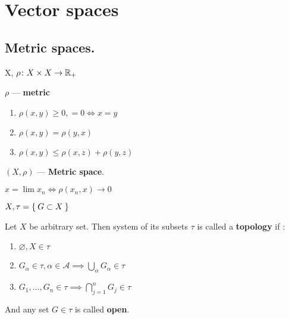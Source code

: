 \chapter{Vector spaces}
\section{Metric spaces.}

X, $\rho\colon X \times X \to \mathbb{R}_+$
\begin{defn}$\rho$ --- \textbf{metric}
  \begin{enumerate}
    \item $\rho(x, y) \geq 0, = 0 \iff x = y$
    \item $\rho(x, y) = \rho (y, x)$
    \item $\rho(x, y) \leq \rho (x, z) + \rho (y, z)$
  \end{enumerate}
\end{defn}
\begin{defn}$(X, \rho)$ --- \textbf{Metric space}.\end{defn}
\begin{defn}$x = \lim x_{n} \iff \rho(x_{n}, x) \to 0$\end{defn}
$X, \tau = \Set{G \subset X}$
\begin{defn}
  Let $X$ be arbitrary set. Then system of its subsets $\tau$ is called a
  \textbf{topology} if $\colon$
  \begin{enumerate}
  \item $\varnothing, X \in \tau$
  \item $G_\alpha \in \tau, \alpha \in \mathscr{A} \implies
    \bigcup\limits_\alpha G_\alpha \in \tau$
  \item $G_1, \dotsc, G_n \in \tau \implies \bigcap\limits_{j = 1}^n G_j \in
    \tau$
  \end{enumerate}
And any set $G \in \tau$ is called \textbf{open}.
\end{defn}

